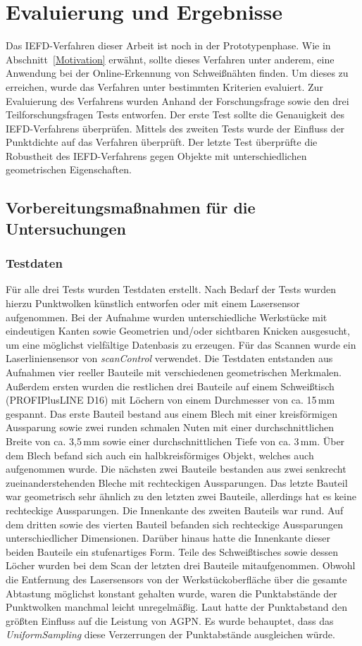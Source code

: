 \chapter{Evaluierung und Ergebnisse}
Das IEFD-Verfahren dieser Arbeit ist noch in der Prototypenphase. Wie in Abschnitt~\ref{Motivation} erwähnt, sollte dieses Verfahren unter anderem, eine Anwendung bei der Online-Erkennung von Schweißnähten finden. Um dieses zu erreichen, wurde das Verfahren unter bestimmten Kriterien evaluiert. Zur Evaluierung des Verfahrens wurden Anhand der Forschungsfrage sowie den drei Teilforschungsfragen Tests entworfen. Der erste Test sollte die Genauigkeit des IEFD-Verfahrens überprüfen. Mittels des zweiten Tests wurde der Einfluss der Punktdichte auf das Verfahren überprüft. Der letzte Test überprüfte die Robustheit des IEFD-Verfahrens gegen Objekte mit unterschiedlichen geometrischen Eigenschaften.

\section{Vorbereitungsmaßnahmen für die Untersuchungen}
\subsection{Testdaten}\label{test_data}
Für alle drei Tests wurden Testdaten erstellt. Nach Bedarf der Tests wurden hierzu Punktwolken künstlich entworfen oder mit einem Lasersensor aufgenommen. Bei der Aufnahme wurden unterschiedliche Werkstücke mit eindeutigen Kanten sowie Geometrien und/oder sichtbaren Knicken ausgesucht, um eine möglichst vielfältige Datenbasis zu erzeugen. Für das Scannen wurde ein Laserliniensensor von \textit{scanControl} verwendet. Die Testdaten entstanden aus Aufnahmen vier reeller Bauteile mit verschiedenen geometrischen Merkmalen. Außerdem ersten wurden die restlichen drei Bauteile auf einem Schweißtisch (PROFIPlusLINE D16) mit Löchern von einem Durchmesser von ca. 15\,mm gespannt. Das erste Bauteil bestand aus einem Blech mit einer kreisförmigen Aussparung sowie zwei runden schmalen Nuten mit einer durchschnittlichen Breite von ca. 3,5\,mm sowie einer durchschnittlichen Tiefe von ca. 3\,mm. Über dem Blech befand sich auch ein halbkreisförmiges Objekt, welches auch aufgenommen wurde. Die nächsten zwei Bauteile bestanden aus zwei senkrecht zueinanderstehenden Bleche mit rechteckigen Aussparungen. Das letzte Bauteil war geometrisch sehr ähnlich zu den letzten zwei Bauteile, allerdings hat es keine rechteckige Aussparungen. Die Innenkante des zweiten Bauteils war rund. Auf dem dritten sowie des vierten Bauteil befanden sich rechteckige Aussparungen unterschiedlicher Dimensionen. Darüber hinaus hatte die Innenkante dieser beiden Bauteile ein stufenartiges Form. Teile des Schweißtisches sowie dessen Löcher wurden bei dem Scan der letzten drei Bauteile mitaufgenommen. Obwohl die Entfernung des Lasersensors von der Werkstückoberfläche über die gesamte Abtastung möglichst konstant gehalten wurde, waren die Punktabstände der Punktwolken manchmal leicht unregelmäßig. Laut \textcite[9]{ni_edge_2016} hatte der Punktabstand den größten Einfluss auf die Leistung von AGPN. Es wurde behauptet, dass das \textit{UniformSampling} diese Verzerrungen der Punktabstände ausgleichen würde. 

